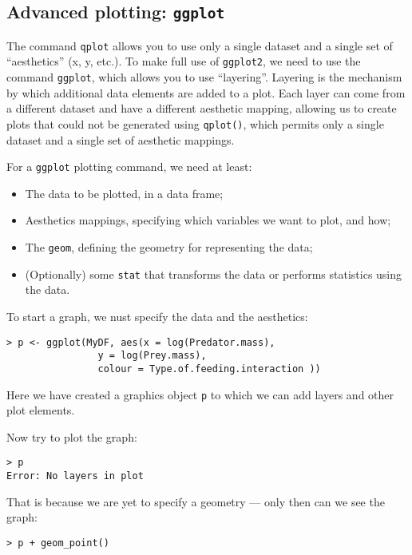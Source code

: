 

\subsection{Advanced plotting: {\tt ggplot}}

The command {\tt qplot} allows you to use only a single dataset and
a single set of ``aesthetics'' (x, y, etc.). To make full use of
{\tt ggplot2}, we need to use the command {\tt ggplot}, which allows 
you to use ``layering''. Layering is the mechanism by which additional 
data elements are added to a plot. Each layer can come from a different 
dataset and have a different aesthetic mapping, allowing us to create 
plots that could not be generated using {\tt qplot()}, which permits 
only a single dataset and a single set of aesthetic mappings. 

For a {\tt ggplot} plotting command, we need at least:
\begin{itemize}
	\item The data to be plotted, in a data frame;
	\item Aesthetics mappings, specifying which variables we want to
	plot, and how;
	\item The {\tt geom}, defining the geometry for representing the data;
	\item (Optionally) some {\tt stat} that transforms the data or
	performs statistics using the data.
\end{itemize}

To start a graph, we nust specify the data and the aesthetics:

\begin{lstlisting}
> p <- ggplot(MyDF, aes(x = log(Predator.mass),
				y = log(Prey.mass),
				colour = Type.of.feeding.interaction ))
\end{lstlisting}

Here we have created a graphics object {\tt p} to which we can add 
layers and other plot elements. 

Now try to plot the graph:

\begin{lstlisting}
> p
Error: No layers in plot
\end{lstlisting}

That is because we are yet to specify a geometry --- only then can we 
see the graph:

\begin{lstlisting}
> p + geom_point()
\end{lstlisting}

